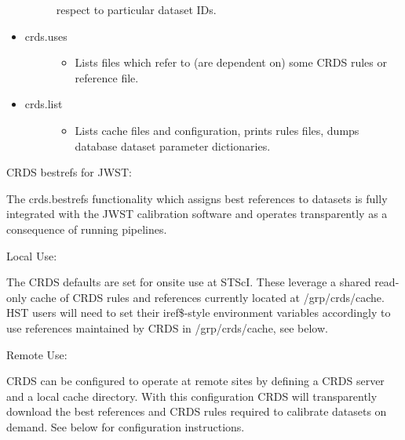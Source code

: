 \documentclass[letterpaper,10pt,english]{sphinxmanual}
\begin{document}
\begin{itemize}
\begin{description}
\begin{itemize}
\end{itemize}

respect to particular dataset IDs.

\end{description}

\item {} \begin{description}
\item[{crds.uses}] \leavevmode\begin{itemize}
\item {} 
Lists files which refer to (are dependent on) some CRDS rules or reference file.

\end{itemize}

\end{description}

\item {} \begin{description}
\item[{crds.list}] \leavevmode\begin{itemize}
\item {} 
Lists cache files and configuration,  prints rules files,  dumps database dataset parameter dictionaries.

\end{itemize}

\end{description}

\end{itemize}

CRDS bestrefs for JWST:

The crds.bestrefs functionality which assigns best references to datasets is fully integrated with the
JWST calibration software and operates transparently as a consequence of running pipelines.

Local Use:

The CRDS defaults are set for onsite use at STScI.   These leverage a shared read-only cache of CRDS rules
and references currently located at /grp/crds/cache.  HST users will need to set their iref\$-style environment
variables accordingly to use references maintained by CRDS in /grp/crds/cache,  see below.

Remote Use:

CRDS can be configured to operate at remote sites by defining a CRDS server and a local cache directory.  With
this configuration CRDS will transparently download the best references and CRDS rules required to calibrate datasets
on demand.  See below for configuration instructions.
\end{document}
